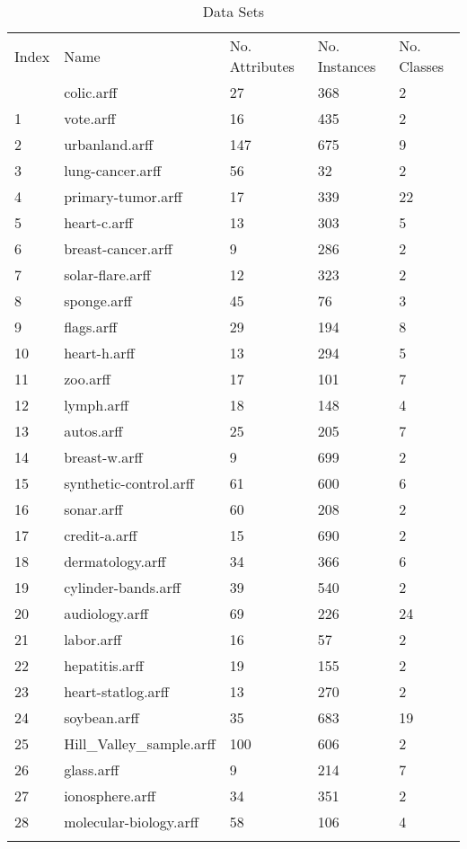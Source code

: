 \begin{table*}[h]
\caption{Data Sets}
\label{tbl:datasets}\begin{tabular}{lllll}
\noalign{\smallskip}\hline\noalign{\smallskip}
Index&Name&No. Attributes&No. Instances&No. Classes\\\noalign{\smallskip}\hline
0&colic.arff&27&368&2\\
1&vote.arff&16&435&2\\
2&urbanland.arff&147&675&9\\
3&lung-cancer.arff&56&32&2\\
4&primary-tumor.arff&17&339&22\\
5&heart-c.arff&13&303&5\\
6&breast-cancer.arff&9&286&2\\
7&solar-flare.arff&12&323&2\\
8&sponge.arff&45&76&3\\
9&flags.arff&29&194&8\\
10&heart-h.arff&13&294&5\\
11&zoo.arff&17&101&7\\
12&lymph.arff&18&148&4\\
13&autos.arff&25&205&7\\
14&breast-w.arff&9&699&2\\
15&synthetic-control.arff&61&600&6\\
16&sonar.arff&60&208&2\\
17&credit-a.arff&15&690&2\\
18&dermatology.arff&34&366&6\\
19&cylinder-bands.arff&39&540&2\\
20&audiology.arff&69&226&24\\
21&labor.arff&16&57&2\\
22&hepatitis.arff&19&155&2\\
23&heart-statlog.arff&13&270&2\\
24&soybean.arff&35&683&19\\
25&Hill_Valley_sample.arff&100&606&2\\
26&glass.arff&9&214&7\\
27&ionosphere.arff&34&351&2\\
28&molecular-biology.arff&58&106&4\\
\noalign{\smallskip}\hline
\end{tabular}
\end{table*}